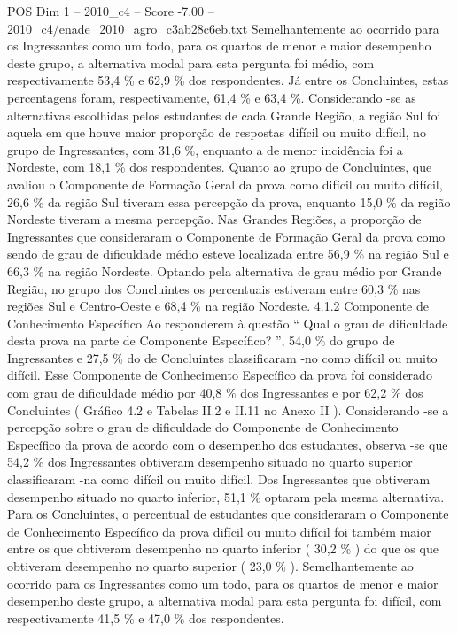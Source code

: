 \begin{textsample}{POS Dim 1 – 2010\_c4 – Score -7.00 – 2010\_c4/enade\_2010\_agro\_c3ab28c6eb.txt}
Semelhantemente ao ocorrido para os Ingressantes como um todo, para os quartos de menor e maior desempenho deste grupo, a alternativa modal para esta pergunta foi médio, com respectivamente 53,4 \% e 62,9 \% dos respondentes.
Já entre os Concluintes, estas percentagens foram, respectivamente, 61,4 \% e 63,4 \%.
Considerando -se as alternativas escolhidas pelos estudantes de cada Grande Região, a região Sul foi aquela em que houve maior proporção de respostas difícil ou muito difícil, no grupo de Ingressantes, com 31,6 \%, enquanto a de menor incidência foi a Nordeste, com 18,1 \% dos respondentes.
Quanto ao grupo de Concluintes, que avaliou o Componente de Formação Geral da prova como difícil ou muito difícil, 26,6 \% da região Sul tiveram essa percepção da prova, enquanto 15,0 \% da região Nordeste tiveram a mesma percepção.
Nas Grandes Regiões, a proporção de Ingressantes que consideraram o Componente de Formação Geral da prova como sendo de grau de dificuldade médio esteve localizada entre 56,9 \% na região Sul e 66,3 \% na região Nordeste.
Optando pela alternativa de grau médio por Grande Região, no grupo dos Concluintes os percentuais estiveram entre 60,3 \% nas regiões Sul e Centro-Oeste e 68,4 \% na região Nordeste. 4.1.2 Componente de Conhecimento Específico Ao responderem à questão “ Qual o grau de dificuldade desta prova na parte de Componente Específico? ”, 54,0 \% do grupo de Ingressantes e 27,5 \% do de Concluintes classificaram -no como difícil ou muito difícil.
Esse Componente de Conhecimento Específico da prova foi considerado com grau de dificuldade médio por 40,8 \% dos Ingressantes e por 62,2 \% dos Concluintes ( Gráfico 4.2 e Tabelas II.2 e II.11 no Anexo II ).
Considerando -se a percepção sobre o grau de dificuldade do Componente de Conhecimento Específico da prova de acordo com o desempenho dos estudantes, observa -se que 54,2 \% dos Ingressantes obtiveram desempenho situado no quarto superior classificaram -na como difícil ou muito difícil.
Dos Ingressantes que obtiveram desempenho situado no quarto inferior, 51,1 \% optaram pela mesma alternativa.
Para os Concluintes, o percentual de estudantes que consideraram o Componente de Conhecimento Específico da prova difícil ou muito difícil foi também maior entre os que obtiveram desempenho no quarto inferior ( 30,2 \% ) do que os que obtiveram desempenho no quarto superior ( 23,0 \% ).
Semelhantemente ao ocorrido para os Ingressantes como um todo, para os quartos de menor e maior desempenho deste grupo, a alternativa modal para esta pergunta foi difícil, com respectivamente 41,5 \% e 47,0 \% dos respondentes.

\end{textsample}
